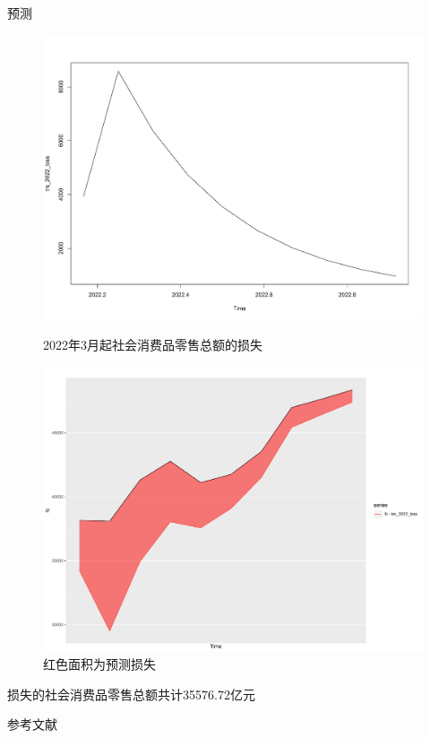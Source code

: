 \documentclass[10pt]{beamer}
\begin{document}
\begin{frame}{预测}
  \begin{figure}[H] %
    \centering %
    \begin{minipage}[t]{0.48\textwidth}
      \centering
      \includegraphics[width=1\textwidth]{figures/loss_2022.pdf} %
      \caption{2022年3月起社会消费品零售总额的损失} %
      \label{loss_2022} %
    \end{minipage}
    \begin{minipage}[t]{0.48\textwidth}
      \centering %
      \includegraphics[width=1\textwidth]{figures/compare_2022.pdf} %
      \caption{红色面积为预测损失} %
      \label{compare_2022} %
    \end{minipage}
  \end{figure} 
  损失的社会消费品零售总额共计35576.72亿元\nocite{stl}\nocite{yang2022estimating}\nocite{Rob}\nocite{Ruey}\nocite{yandou}
\end{frame}


\begin{frame}{参考文献}
  
  
\end{frame}
\end{document}
